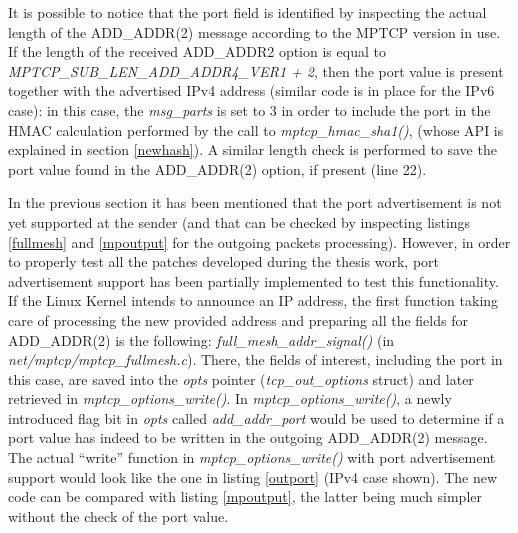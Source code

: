 It is possible to notice that the port field is identified by inspecting the actual length of the ADD\_ADDR(2) message according to the MPTCP version in use. If the length of the received ADD\_ADDR2 option is equal to \textit{MPTCP\_SUB\_LEN\_ADD\_ADDR4\_VER1 + 2}, then the port value is present together with the advertised IPv4 address (similar code is in place for the IPv6 case): in this case, the \textit{msg\_parts} is set to 3 in order to include the port in the HMAC calculation performed by the call to \textit{mptcp\_hmac\_sha1()}, (whose API is explained in section \ref{newhash}). A similar length check is performed to save the port value found in the ADD\_ADDR(2) option, if present (line 22).

In the previous section it has been mentioned that the port advertisement is not yet supported at the sender (and that can be checked by inspecting listings \ref{fullmesh} and \ref{mpoutput} for the outgoing packets processing).
However, in order to properly test all the patches developed during the thesis work, port advertisement support has been partially implemented to test this functionality. If the Linux Kernel intends to announce an IP address, the first function taking care of processing the new provided address and preparing all the fields for ADD\_ADDR(2) is the following: \textit{full\_mesh\_addr\_signal()} (in \textit{net/mptcp/mptcp\_fullmesh.c}). There, the fields of interest, including the port in this case, are saved into the \textit{opts} pointer (\textit{tcp\_out\_options} struct) and later retrieved in \textit{mptcp\_options\_write()}. In \textit{mptcp\_options\_write()}, a newly introduced flag bit in \textit{opts} called \textit{add\_addr\_port} would be used to determine if a port value has indeed to be written in the outgoing ADD\_ADDR(2) message. The actual ``write'' function in \textit{mptcp\_options\_write()} with port advertisement support would look like the one in listing \ref{outport} (IPv4 case shown). The new code can be compared with listing \ref{mpoutput}, the latter being much simpler without the check of the port value.

